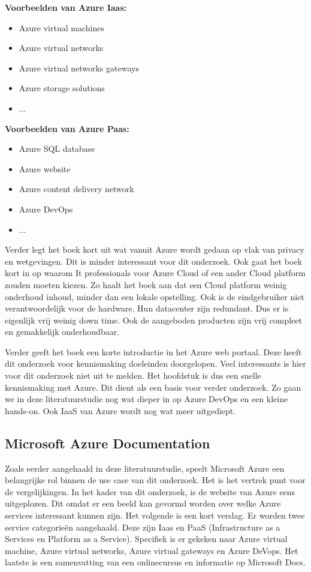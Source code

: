 \textbf{Voorbeelden van Azure Iaas:}
\begin{itemize}
    \item Azure virtual machines
    \item Azure virtual networks
    \item Azure virtual networks gateways
    \item Azure storage solutions
    \item ...
\end{itemize}
\textbf{Voorbeelden van Azure Paas:}
\begin{itemize}
    \item Azure SQL database
    \item Azure website
    \item Azure content delivery network
    \item Azure DevOps
    \item ...
\end{itemize}
Verder legt het boek  \autocite{Copeland2015} kort uit wat vanuit Azure wordt gedaan op vlak van privacy en wetgevingen. Dit is minder interessant voor dit onderzoek. Ook gaat het boek kort in op waarom It professionals voor Azure Cloud of een ander Cloud platform zouden moeten kiezen. Zo haalt het boek  \autocite{Copeland2015} aan dat een Cloud platform weinig onderhoud inhoud, minder dan een lokale opstelling. Ook is de eindgebruiker niet verantwoordelijk voor de hardware. Hun datacenter zijn redundant. Dus er is eigenlijk vrij weinig down time. Ook de aangeboden producten zijn vrij compleet en gemakkelijk onderhoudbaar.

Verder geeft het boek  \autocite{Copeland2015} een korte introductie in het Azure web portaal. Deze heeft dit onderzoek voor kennismaking doeleinden doorgelopen. Veel interessants is hier voor dit onderzoek niet uit te melden. Het hoofdstuk is dus een snelle kennismaking met Azure. Dit dient als een basis voor verder onderzoek. Zo gaan we in deze literatuurstudie nog wat dieper in op Azure DevOps en een kleine hands-on. Ook IaaS van Azure wordt nog wat meer uitgediept.

\subsection{Microsoft Azure Documentation}
Zoals eerder aangehaald in deze literatuurstudie, speelt Microsoft Azure een belangrijke rol binnen de use case van dit onderzoek. Het is het vertrek punt voor de vergelijkingen. In het kader van dit onderzoek, is de website van Azure eens uitgeplozen. Dit omdat er een beeld kan gevormd worden over welke Azure services interessant kunnen zijn. Het volgende is een kort verslag. Er worden twee service categorieën aangehaald. Deze zijn Iaas en PaaS (Infrastructure as a Services en Platform as a Service). Specifiek is er gekeken naar Azure virtual machine, Azure virtual networks, Azure virtual gateways en Azure DeVops. Het laatste is een samenvatting van een onlinecursus en informatie op Microsoft Docs.

